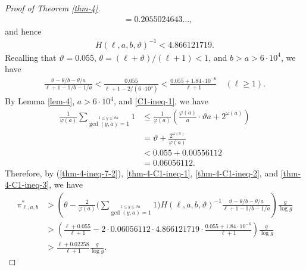 \documentclass[12pt,a4paper,reqno]{amsart}
\numberwithin{equation}{section}
\theoremstyle{plain}
\theoremstyle{definition}
\begin{document}
\begin{proof}[Proof of Theorem \ref{thm-4}]
\begin{align*}
	&= 0.2055024643\ldots, 
\end{align*}
and hence
\begin{align}\label{thm-4-C1-ineq-1}
	H(\ell,a,b,\vartheta)^{-1} <4.866121719.
\end{align}
Recalling that $\vartheta=0.055$, $\theta=(\ell+\vartheta)/(\ell+1)<1$, and $b>a>6\cdot 10^{4}$, we have
\begin{align}\label{thm-4-C1-ineq-2}
\frac{\vartheta-\theta/b-\theta/a}{\ell+1-1/b-1/a}
<\frac{0.055}{\ell+1-2/(6\cdot 10^{4})}
<\frac{0.055+1.84\cdot 10^{-6}}{\ell+1} \quad(\ell\geq 1).
\end{align}
By Lemma \ref{lem-4}, $a>6\cdot 10^{4}$, and  \eqref{C1-ineq-1}, we have
\begin{align}
	\frac{1}{\varphi(a)}\sum_{\stackrel{1\leq y\leq \vartheta a}{\gcd(y,a)=1}} 1
	&\leq \frac{1}{\varphi(a)} \left(\frac{\varphi(a)}{a} \cdot \vartheta a+2^{\omega(a)}\right)\nonumber\\
	&= \vartheta+\frac{2^{\omega(a)}}{\varphi(a)}\nonumber\\
	&< 0.055+0.00556112\nonumber\\
	&= 0.06056112. \label{thm-4-C1-ineq-3}
\end{align}
Therefore, by (\ref{thm-4-ineq-7-2}), \eqref{thm-4-C1-ineq-1}, \eqref{thm-4-C1-ineq-2}, and \eqref{thm-4-C1-ineq-3}, we have
\begin{align*}\label{thm-4-C1-ineq-4}
	\pi^{*}_{\ell,a,b} 
	 &> \left( \theta-
	\frac{2}{\varphi(a)}
	\Bigg( \sum_{\stackrel{1\leq y\leq \vartheta a}{\gcd(y,a)=1}}1\Bigg) H(\ell,a,b,\vartheta)^{-1} 
	\frac{\vartheta-\theta/b-\theta/a}{\ell+1-1/b-1/a} 
	\right) \frac{g}{\log g}\\
	&>\left( 
		\frac{\ell+0.055}{\ell+1}- 2\cdot 0.06056112 \cdot 4.866121719 \cdot \frac{0.055+1.84\cdot 10^{-6}}{\ell+1}
	\right)
	\frac{g}{\log g}\\
	&> \frac{\ell+0.02258}{\ell+1}\frac{g}{\log g}.
\end{align*}


\end{proof}
\end{document}
